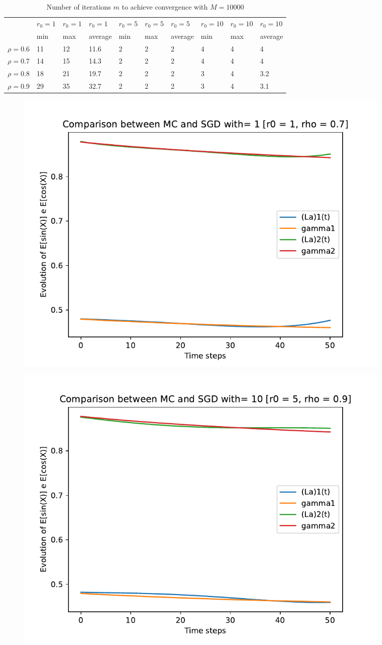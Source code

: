 \documentclass[a4paper,11pt,openright]{report}
\begin{document}
\begin{table}[H]
\centering
\addtolength{\leftskip}{-1.5cm}
\addtolength{\rightskip}{-1.5cm}
\begin{tabular}{|c|lllllllll|}
\hline
$ $ & $r_0 = 1$ & $r_0 = 1$ & $r_0 = 1$ & $r_0 = 5$ & $r_0 = 5$ & $r_0 = 5$ & $r_0 = 10$ & $r_0 = 10$ & $r_0 = 10$  \\
$ $ & min & max & average & min & max & average & min & max & average \\ 
\hline
$\rho = 0.6$ & 11 & 12 & 11.6 & 2 & 2 & 2 & 4 & 4 & 4\\

$\rho = 0.7$ & 14 & 15 & 14.3 & 2 & 2 & 2 & 4 & 4 & 4\\

$\rho = 0.8$ & 18 & 21 & 19.7 & 2 & 2 & 2 & 3 & 4 & 3.2\\

$\rho = 0.9$ & 29 & 35 & 32.7 & 2 & 2 & 2 & 3 & 4 & 3.1\\
\hline
\end{tabular}
\caption{Number of iterations $m$ to achieve convergence with $M = 10000$}
\end{table}
\begin{figure}[H]
\centering
\includegraphics[width=0.9\textwidth]{images/graphics T = 0.5/n = 4, M = 1 sine and cosine.pdf}
\end{figure}
\begin{figure}[H]
\centering
\includegraphics[width=0.9\textwidth]{images/graphics T = 0.5/n = 4, M = 10 sine and cosine.pdf}
\end{figure}
\end{document}
